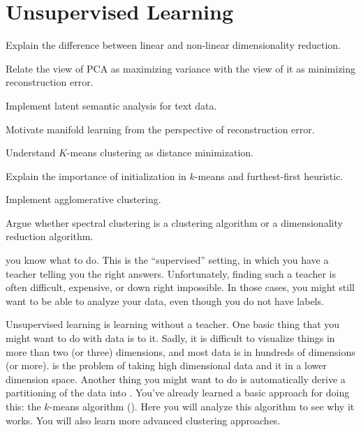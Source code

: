 \chapter{Unsupervised Learning} \label{sec:unsup}


\begin{learningobjectives}
\item Explain the difference between linear and non-linear
  dimensionality reduction.
\item Relate the view of PCA as maximizing variance with the view of
  it as minimizing reconstruction error.
\item Implement latent semantic analysis for text data.
\item Motivate manifold learning from the perspective of
  reconstruction error.
\item Understand $K$-means clustering as distance minimization.
\item Explain the importance of initialization in $k$-means and
  furthest-first heuristic.
\item Implement agglomerative clustering.
\item Argue whether spectral clustering is a clustering algorithm or a
  dimensionality reduction algorithm.
\end{learningobjectives}

\dependencies{}

 you know
what to do.  This is the ``supervised'' setting, in which you have a
teacher telling you the right answers.  Unfortunately, finding such a
teacher is often difficult, expensive, or down right impossible.  In
those cases, you might still want to be able to analyze your data,
even though you do not have labels.

Unsupervised learning is learning without a teacher.  One basic thing
that you might want to do with data is to  it.
Sadly, it is difficult to visualize things in more than two (or three)
dimensions, and most data is in hundreds of dimensions (or more).
 is the
problem of taking high dimensional data and  it in
a lower dimension space.  Another thing you might want to do is
automatically derive a partitioning of the data into
.  You've already learned a basic
approach for doing this: the $k$-means algorithm ().
Here you will analyze this algorithm to see why it works.  You will
also learn more advanced clustering approaches.

